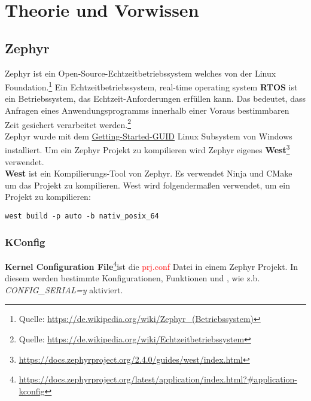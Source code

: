 \section{Theorie und Vorwissen}
\subsection{Zephyr}
    Zephyr ist ein Open-Source-Echtzeitbetriebssystem welches von der Linux Foundation.\footnote{Quelle: \url{https://de.wikipedia.org/wiki/Zephyr_(Betriebssystem)}}
    Ein Echtzeitbetriebssystem, real-time operating system \textbf{RTOS} ist ein Betriebssystem, das Echtzeit-Anforderungen erfüllen kann. 
    Das bedeutet, dass Anfragen eines Anwendungsprogramms innerhalb einer Voraus bestimmbaren Zeit gesichert verarbeitet werden.\footnote{Quelle: \url{https://de.wikipedia.org/wiki/Echtzeitbetriebssystem}}
    \\
    Zephyr wurde mit dem \href{https://docs.zephyrproject.org/latest/getting_started/index.html}{Getting-Started-GUID} Linux Subsystem von Windows installiert. 
    Um ein Zephyr Projekt zu kompilieren wird Zephyr eigenes \textbf{West}\footnote{\url{https://docs.zephyrproject.org/2.4.0/guides/west/index.html}} verwendet.\\
    \textbf{West} ist ein Kompilierungs-Tool von Zephyr. Es verwendet Ninja und CMake um das Projekt zu kompilieren. 
    West wird folgendermaßen verwendet, um ein Projekt zu kompilieren: 
    \begin{lstlisting}[style=StyleC, captionpos=b, caption=West Beispiel, label=West Beispiel]
west build -p auto -b nativ_posix_64 
    \end{lstlisting}

    \subsubsection{KConfig}
    \textbf{Kernel Configuration File}\footnote{\url{https://docs.zephyrproject.org/latest/application/index.html?\#application-kconfig}}ist die \textcolor{red}{prj.conf} Datei in einem 
    Zephyr Projekt. In diesem werden bestimmte Konfigurationen, Funktionen und , wie z.b. \textit{CONFIG\_SERIAL=y} aktiviert. 


\newpage
